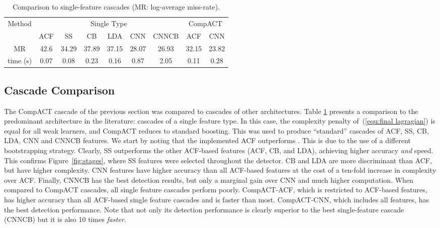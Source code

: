 \documentclass[10pt,twocolumn,letterpaper]{article}
\begin{document}
\begin{table}[t]
\centering \scriptsize \setlength{\tabcolsep}{3.0pt}
\vspace{0.1cm} \caption{Comparison to single-feature cascades (MR: log-average miss-rate).}
\label{tab:cascade comparison single}
\begin{tabular}
{|c||cccccc|cc|}\hline
\multirow{2}{*}{Method}
&\multicolumn{6}{|c|}{Single Type}
&\multicolumn{2}{|c|}{CompACT}\\
\cline{2-9}
& ACF & SS & CB & LDA & CNN & CNNCB & ACF & CNN \\\hline
MR         &42.6  &34.29  &37.89 &37.15 &28.07 &26.93 &32.15 &23.82\\
time (s)   &0.07  &0.08   &0.23  &0.16  &0.87  &2.05  &0.11  &0.28\\\hline
\end{tabular}
\end{table}


\subsection{Cascade Comparison}
\label{subsec:cascade comp}

The CompACT cascade of the previous section was compared to cascades
of other architectures. Table \ref{tab:cascade comparison single}
presents a comparison to the predominant architecture in the literature:
cascades of a single feature type. In this case, the
complexity penalty of~(\ref{equ:final lagragian}) is equal for all weak
learners, and CompACT reduces to standard boosting. This
was used to produce ``standard''
cascades of ACF, SS, CB, LDA, CNN and CNNCB features.
We start by noting that the implemented ACF outperforms \cite{DBLP:journals/pami/DollarABP14}. This is due to the use of a different
bootstrapping strategy.
Clearly, SS outperforms the other ACF-based features (ACF, CB, and LDA),
achieving higher accuracy {\it and\/} speed. This confirms
Figure~\ref{fig:stages}, where SS features were selected
throughout the detector. CB and LDA are more discriminant than ACF,
but have higher complexity. CNN features have higher accuracy than all
ACF-based features at the cost of a ten-fold increase in complexity over
ACF. Finally, CNNCB has the best detection results, but only a
marginal gain over CNN and much higher computation.
When compared to CompACT cascades, all single feature cascades
perform poorly. CompACT-ACF, which is restricted to ACF-based features,
has higher accuracy than all ACF-based single feature cascades
and is faster than most. CompACT-CNN, which
includes all features, has the best detection performance.
Note that not only its detection performance is clearly superior to the
best single-feature cascade (CNNCB) but it is also 10 times {\it faster\/}.
\end{document}
